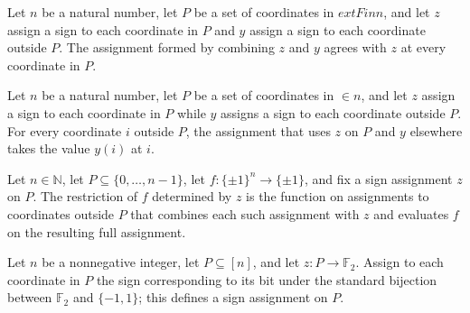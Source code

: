 \begin{theorem}
\label{FABL.combineJuntaAssignment_apply_fixed}
\leanok
{}
Let $n$ be a natural number, let $P$ be a set of coordinates in $	ext{Fin }n$, and let
$z$ assign a sign to each coordinate in $P$ and $y$ assign a sign to each coordinate
outside $P$. The assignment formed by combining $z$ and $y$ agrees with $z$ at every
coordinate in $P$.
\end{theorem}

\begin{theorem}
\label{FABL.combineJuntaAssignment_apply_free}
\leanok
{}
Let $n$ be a natural number, let $P$ be a set of coordinates in $\in n$, and let $z$
assign a sign to each coordinate in $P$ while $y$ assigns a sign to each coordinate
outside $P$. For every coordinate $i$ outside $P$, the assignment that uses $z$ on $P$
and $y$ elsewhere takes the value $y(i)$ at $i$.
\end{theorem}

\begin{definition}
\label{FABL.juntaRestriction}
\leanok
{}
Let $n\in\mathbb N$, let $P\subseteq\{0,\ldots,n-1\}$, let $f:\{\pm1\}^n\to\{\pm1\}$,
and fix a sign assignment $z$ on $P$. The restriction of $f$ determined by $z$ is the
function on assignments to coordinates outside $P$ that combines each such assignment
with $z$ and evaluates $f$ on the resulting full assignment.
\end{definition}

\begin{definition}
\leanok
{}
Let $n$ be a nonnegative integer, let $P\subseteq[n]$, and let $z:P\to\mathbb F_2$.
Assign to each coordinate in $P$ the sign corresponding to its bit under the standard
bijection between $\mathbb F_2$ and $\{-1,1\}$; this defines a sign assignment on $P$.
\end{definition}

